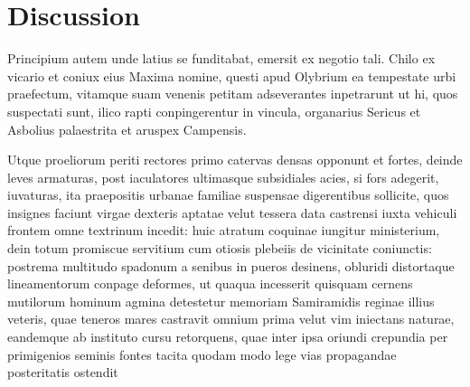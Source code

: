 \chapter{Discussion}
\label{chap:discussion}
Principium autem unde latius se funditabat, emersit ex negotio tali. Chilo ex vicario et coniux eius Maxima nomine, questi apud Olybrium ea tempestate urbi praefectum, vitamque suam venenis petitam adseverantes inpetrarunt ut hi, quos suspectati sunt, ilico rapti conpingerentur in vincula, organarius Sericus et Asbolius palaestrita et aruspex Campensis.

Utque proeliorum periti rectores primo catervas densas opponunt et fortes, deinde leves armaturas, post iaculatores ultimasque subsidiales acies, si fors adegerit, iuvaturas, ita praepositis urbanae familiae suspensae digerentibus sollicite, quos insignes faciunt virgae dexteris aptatae velut tessera data castrensi iuxta vehiculi frontem omne textrinum incedit: huic atratum coquinae iungitur ministerium, dein totum promiscue servitium cum otiosis plebeiis de vicinitate coniunctis: postrema multitudo spadonum a senibus in pueros desinens, obluridi distortaque lineamentorum conpage deformes, ut quaqua incesserit quisquam cernens mutilorum hominum agmina detestetur memoriam Samiramidis reginae illius veteris, quae teneros mares castravit omnium prima velut vim iniectans naturae, eandemque ab instituto cursu retorquens, quae inter ipsa oriundi crepundia per primigenios seminis fontes tacita quodam modo lege vias propagandae posteritatis ostendit